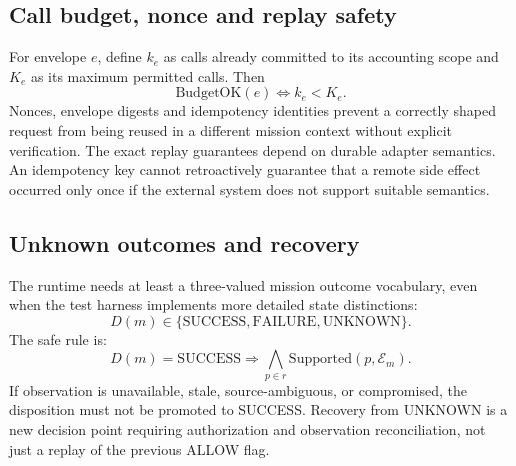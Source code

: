 \documentclass[11pt,twocolumn]{article}
\newcommand{\evid}{\mathcal{E}}
\begin{document}
\subsection{Call budget, nonce and replay safety}
For envelope $e$, define $k_e$ as calls already committed to its accounting scope and $K_e$ as its maximum permitted calls. Then
\begin{equation}
\mathrm{BudgetOK}(e)\iff k_e<K_e.
\label{eq:budget}
\end{equation}
Nonces, envelope digests and idempotency identities prevent a correctly shaped request from being reused in a different mission context without explicit verification. The exact replay guarantees depend on durable adapter semantics. An idempotency key cannot retroactively guarantee that a remote side effect occurred only once if the external system does not support suitable semantics.

\subsection{Unknown outcomes and recovery}
The runtime needs at least a three-valued mission outcome vocabulary, even when the test harness implements more detailed state distinctions:
\begin{equation}
D(m)\in\{\mathrm{SUCCESS},\mathrm{FAILURE},\mathrm{UNKNOWN}\}.
\label{eq:outcome}
\end{equation}
The safe rule is:
\begin{equation}
D(m)=\mathrm{SUCCESS}\Rightarrow
\bigwedge_{p\in r}\mathrm{Supported}(p,\evid_{m}).
\label{eq:success}
\end{equation}
If observation is unavailable, stale, source-ambiguous, or compromised, the disposition must not be promoted to SUCCESS. Recovery from UNKNOWN is a new decision point requiring authorization and observation reconciliation, not just a replay of the previous ALLOW flag.
\end{document}
